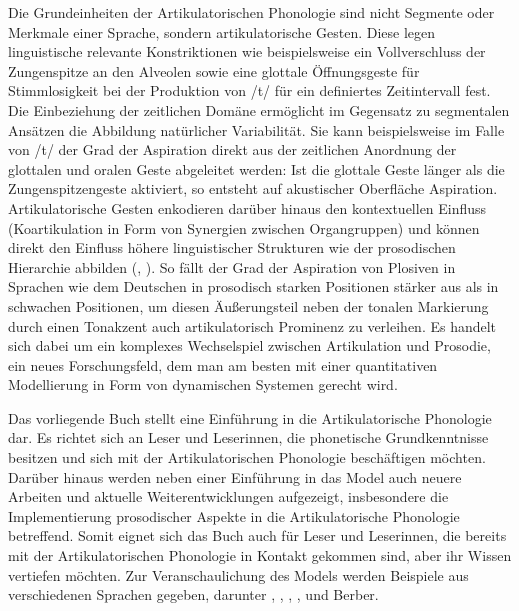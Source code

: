 Die Grundeinheiten der Artikulatorischen Phonologie sind nicht Segmente oder Merkmale einer Sprache, sondern artikulatorische Gesten. Diese legen linguistische relevante Konstriktionen wie beispielsweise ein Vollverschluss der Zungenspitze an den Alveolen sowie eine glottale Öffnungsgeste für Stimmlosigkeit bei der Produktion von /t/ für ein definiertes Zeitintervall fest. Die Einbeziehung der zeitlichen Domäne ermöglicht im Gegensatz zu segmentalen Ansätzen die Abbildung natürlicher Variabilität. Sie kann beispielsweise im Falle von /t/ der Grad der Aspiration direkt aus der zeitlichen Anordnung der glottalen und oralen Geste abgeleitet werden: Ist die glottale Geste länger als die Zungenspitzengeste aktiviert, so entsteht auf akustischer Oberfläche Aspiration. Artikulatorische Gesten enkodieren darüber hinaus den kontextuellen Einfluss (Koartikulation in Form von Synergien zwischen Organgruppen) und können direkt den Einfluss höhere linguistischer Strukturen wie der prosodischen Hierarchie abbilden (\citealt{Shaw2011}, \citealt{Mücke2017}). So fällt der Grad der Aspiration von Plosiven in Sprachen wie dem Deutschen in prosodisch starken Positionen stärker aus als in schwachen Positionen, um diesen Äußerungsteil neben der tonalen Markierung durch einen Tonakzent auch artikulatorisch Prominenz zu verleihen. Es handelt sich dabei um ein komplexes Wechselspiel zwischen Artikulation und Prosodie, ein neues Forschungsfeld, dem man am besten mit einer quantitativen Modellierung in Form von dynamischen Systemen gerecht wird. 

Das vorliegende Buch stellt eine Einführung in die Artikulatorische Phonologie dar. Es richtet sich an Leser und Leserinnen, die phonetische Grundkenntnisse besitzen und sich mit der Artikulatorischen Phonologie beschäftigen möchten. Darüber hinaus werden neben einer Einführung in das Model auch neuere Arbeiten und aktuelle Weiterentwicklungen aufgezeigt, insbesondere die Implementierung prosodischer Aspekte in die Artikulatorische Phonologie betreffend. Somit eignet sich das Buch auch für Leser und Leserinnen, die bereits mit der Artikulatorischen Phonologie in Kontakt gekommen sind, aber ihr Wissen vertiefen möchten. Zur Veranschaulichung des Models werden Beispiele aus verschiedenen Sprachen gegeben, darunter , , , ,  und  Berber.

